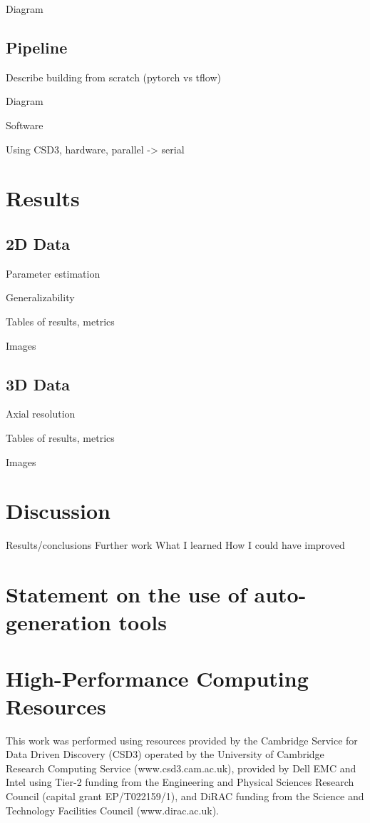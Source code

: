 \documentclass[12pt]{article}
\begin{document}
Diagram

\subsection{Pipeline}
Describe building from scratch (pytorch vs tflow)

Diagram

Software

Using CSD3, hardware, parallel -> serial

\section{Results}

\subsection{2D Data}

Parameter estimation

Generalizability

Tables of results, metrics

Images

\subsection{3D Data}

Axial resolution

Tables of results, metrics

Images

\section{Discussion}
Results/conclusions
Further work
What I learned
How I could have improved




\appendix

\section{Statement on the use of auto-generation tools}

\section {High-Performance Computing Resources}

This work was performed using resources provided by the Cambridge Service for Data Driven Discovery (CSD3) operated by the University of Cambridge Research Computing Service (www.csd3.cam.ac.uk),
provided by Dell EMC and Intel using Tier-2 funding from the Engineering and Physical Sciences Research Council (capital grant EP/T022159/1),
and DiRAC funding from the Science and Technology Facilities Council (www.dirac.ac.uk).
\end{document}
